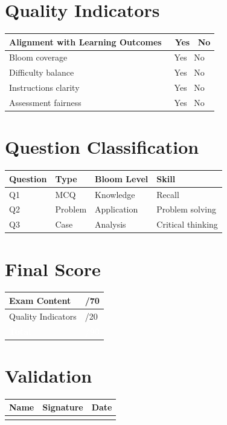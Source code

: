 \documentclass[12pt,a4paper]{article}
\newcommand{\cbox}{\ding{110}}
\newcommand{\yesno}{\cbox\ Yes \hspace{0.5cm} \cbox\ No}
\begin{document}
\section*{\colorbox{EspritBleu}{\color{white}Quality Indicators}}

\begin{longtable}{|p{8cm}|p{3cm}|}
\hline
Alignment with Learning Outcomes & \yesno \\ \hline
Bloom coverage & \yesno \\ \hline
Difficulty balance & \yesno \\ \hline
Instructions clarity & \yesno \\ \hline
Assessment fairness & \yesno \\ \hline
\end{longtable}

\section*{\colorbox{EspritBleu}{\color{white}Question Classification}}

\begin{longtable}{|p{4cm}|p{3cm}|p{3cm}|p{4cm}|}
\hline
Question & Type & Bloom Level & Skill \\ \hline
Q1 & MCQ & Knowledge & Recall \\ \hline
Q2 & Problem & Application & Problem solving \\ \hline
Q3 & Case & Analysis & Critical thinking \\ \hline
\end{longtable}

\section*{\colorbox{EspritBleu}{\color{white}Final Score}}

\begin{center}
\begin{tabular}{|p{8cm}|p{4cm}|}
\hline
Exam Content & /70 \\ \hline
Quality Indicators & /20 \\ \hline
\rowcolor{EspritBleu}
\textcolor{white}{\textbf{Total}} & \textcolor{white}{\textbf{/90}} \\ \hline
\end{tabular}
\end{center}

\section*{\colorbox{EspritBleu}{\color{white}Validation}}

\begin{longtable}{|p{6cm}|p{4cm}|p{4cm}|}
\hline
Name & Signature & Date \\ \hline
 & & \\ \hline
\end{longtable}
\end{document}

